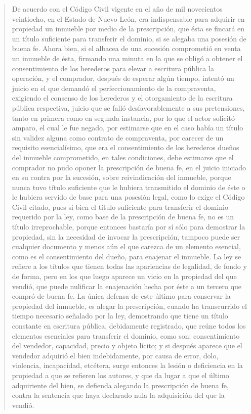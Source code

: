 \documentclass[11pt,a4paper]{article}
\begin{document}
\begin{quote}
De acuerdo con el Código Civil vigente en el año de mil novecientos veintiocho, en el Estado de
Nuevo León, era indispensable para adquirir en propiedad un inmueble por medio de la
prescripción, que ésta se fincará en un título suficiente para transferir el dominio, si se alegaba una
posesión de buena fe. Ahora bien, si el albacea de una sucesión comprometió en venta un inmueble
de ésta, firmando una minuta en la que se obligó a obtener el consentimiento de los herederos para
elevar a escritura pública la operación, y el comprador, después de esperar algún tiempo, intentó un
juicio en el que demandó el perfeccionamiento de la compraventa, exigiendo el consenso de los
herederos y el otorgamiento de la escritura pública respectiva, juicio que se falló desfavorablemente
a sus pretensiones, tanto en primera como en segunda instancia, por lo que el actor solicitó amparo,
el cual le fue negado, por estimarse que en el caso había un título sin validez alguna como contrato
de compraventa, por carecer de un requisito esencialísimo, que era el consentimiento de los
herederos dueños del inmueble comprometido, en tales condiciones, debe estimarse que el
comprador no pudo oponer la prescripción de buena fe, en el juicio iniciado en su contra por la
sucesión, sobre reivindicación del inmueble, porque nunca tuvo título suficiente que le hubiera
transmitido el dominio de éste o le hubiera servido de base para una posesión legal, como lo exige
el Código Civil citado, pues si bien el título suficiente para transferir el dominio requerido por la ley,
como base de la prescripción de buena fe, no es un título irreprochable, porque entonces bastaría
por sí sólo para demostrar la propiedad, sin la necesidad de invocar la prescripción, tampoco puede
ser cualquier documento y menos aún el que carezca de un elemento esencial, como es el
consentimiento del dueño, para enajenar el inmueble. La ley se refiere a los títulos que tienen todas
las apariencias de legalidad, de fondo y de forma, pero en los que luego aparece un vicio en la
propiedad del que vendió, que puede nulificar la enajenación hecha por éste a un tercero que
compró de buena fe. La única defensa de este último para conservar la propiedad del inmueble, es
alegar la prescripción, cuando ha transcurrido el tiempo necesario señalado por la ley, demostrando
que tiene un título constante en escritura pública, debidamente registrado, que reúne todos los
elementos esenciales para transferir el dominio, como son: consentimiento del vendedor, capacidad,
precio y objeto lícito; y si después aparece que el vendedor adquirió el bien indebidamente, por
causa de error, dolo, violencia, incapacidad, etcétera, surge entonces la lesión o deficiencia en la
propiedad a que se refieren los autores, y que da lugar a que el último adquiriente del bien, se
defienda alegando la prescripción de buena fe, contra la sentencia que haya declarado nula la
adquisición del que la vendió.



\end{quote}
\end{document}
